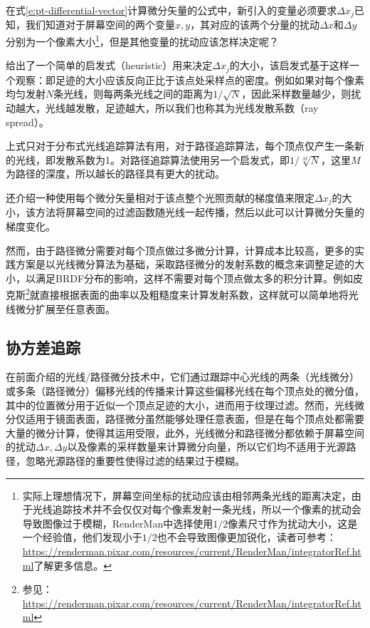 在式\ref{e:pt-differential-vector}计算微分矢量的公式中，新引入的变量必须要求$\Delta x_j$已知，我们知道对于屏幕空间的两个变量$x,y$，其对应的该两个分量的扰动$\Delta x$和$\Delta y$分别为一个像素大小\footnote{实际上理想情况下，屏幕空间坐标的扰动应该由相邻两条光线的距离决定，由于光线追踪技术并不会仅仅对每个像素发射一条光线，所以一个像素的扰动会导致图像过于模糊，RenderMan中选择使用$1/2$像素尺寸作为扰动大小，这是一个经验值，他们发现小于$1/2$也不会导致图像更加锐化，读者可参考：\url{https://renderman.pixar.com/resources/current/RenderMan/integratorRef.html}了解更多信息。}，但是其他变量的扰动应该怎样决定呢？

\cite{a:Pathdifferentialsandapplications}给出了一个简单的启发式（heuristic）用来决定$\Delta x_j$的大小，该启发式基于这样一个观察：即足迹的大小应该反向正比于该点处采样点的密度。例如如果对每个像素均匀发射$N$条光线，则每两条光线之间的距离为$1/\sqrt{N}$，因此采样数量越少，则扰动越大，光线越发散，足迹越大，所以我们也称其为光线发散系数（ray spread）。

上式只对于分布式光线追踪算法有用，对于路径追踪算法，每个顶点仅产生一条新的光线，即发散系数为1。\cite{a:Pathdifferentialsandapplications}对路径追踪算法使用另一个启发式，即$1/\sqrt[M]{N}$，这里$M$为路径的深度，所以越长的路径具有更大的扰动。


\cite{a:Pathdifferentialsandapplications}还介绍一种使用每个微分矢量相对于该点整个光照贡献的梯度值来限定$\Delta x_j$的大小，该方法将屏幕空间的过滤函数随光线一起传播，然后以此可以计算微分矢量的梯度变化。

然而，由于路径微分需要对每个顶点做过多微分计算，计算成本比较高，更多的实践方案是以光线微分算法为基础，采取路径微分的发射系数的概念来调整足迹的大小，以满足BRDF分布的影响，这样不需要对每个顶点做太多的积分计算。例如皮克斯\footnote{参见：\url{https://renderman.pixar.com/resources/current/RenderMan/integratorRef.html}}就直接根据表面的曲率以及粗糙度来计算发射系数，这样就可以简单地将光线微分扩展至任意表面。







\subsection{协方差追踪}\label{sec:pt-covariance-tracing}
在前面介绍的光线/路径微分技术中，它们通过跟踪中心光线的两条（光线微分）或多条（路径微分）偏移光线的传播来计算这些偏移光线在每个顶点处的微分值，其中的位置微分用于近似一个顶点足迹的大小，进而用于纹理过滤。然而，光线微分仅适用于镜面表面，路径微分虽然能够处理任意表面，但是在每个顶点处都需要大量的微分计算，使得其运用受限，此外，光线微分和路径微分都依赖于屏幕空间的扰动$\Delta x,\Delta y$以及像素的采样数量来计算微分向量，所以它们均不适用于光源路径，忽略光源路径的重要性使得过滤的结果过于模糊。

